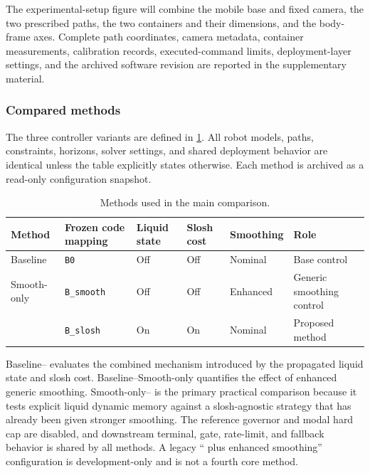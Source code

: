 The experimental-setup figure will combine the mobile base and fixed camera,
the two prescribed paths, the two containers and their dimensions, and the
body-frame axes. Complete path coordinates, camera metadata, container
measurements, calibration records, executed-command limits, deployment-layer
settings, and the archived software revision are reported in the supplementary
material.


\subsubsection{Compared methods}

The three controller variants are defined in \cref{tab:core_variants}. All
robot models, paths, constraints, horizons, solver settings, and shared
deployment behavior are identical unless the table explicitly states
otherwise. Each method is archived as a read-only configuration snapshot.

\begin{table}[t]
  \centering
  \scriptsize
  \setlength{\tabcolsep}{5.0pt}
  \renewcommand{\arraystretch}{1.08}
  \caption{Methods used in the main comparison.}
  \label{tab:core_variants}
  \begin{tabular}{@{}llllll@{}}
    \toprule
    Method & Frozen code mapping & Liquid state & Slosh cost & Smoothing & Role \\
    \midrule
    Baseline \MPCC{} & \texttt{B0} & Off & Off & Nominal & Base \MPCC{} control \\
    Smooth-only \MPCC{} & \texttt{B\_smooth} & Off & Off & Enhanced & Generic smoothing control \\
    \SMPCC{} & \texttt{B\_slosh} & On & On & Nominal & Proposed method \\
    \bottomrule
  \end{tabular}
\end{table}

Baseline--\SMPCC{} evaluates the combined mechanism introduced by the
propagated liquid state and slosh cost. Baseline--Smooth-only quantifies the
effect of enhanced generic smoothing. Smooth-only--\SMPCC{} is the primary
practical comparison because it tests explicit liquid dynamic memory against a
slosh-agnostic strategy that has already been given stronger smoothing. The
reference governor and modal hard cap are disabled, and downstream terminal,
gate, rate-limit, and fallback behavior is shared by all methods. A legacy
``\SMPCC{} plus enhanced smoothing'' configuration is development-only and is
not a fourth core method.

